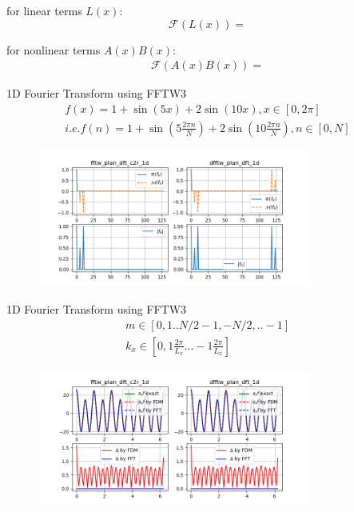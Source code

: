 \documentclass{beamer}
\begin{document}
\begin{frame}
	for linear terms $L(x)$:
	\begin{equation}
		\mathcal{F}(L(x))=
	\end{equation}
	
	for nonlinear terms $A(x)B(x)$:
	\begin{equation}
		\begin{aligned}
			\mathcal{F}(A(x)B(x))=
		\end{aligned}
	\end{equation}
\end{frame}


\begin{frame}{1D Fourier Transform using FFTW3}
	\begin{equation}
		\begin{aligned}
			f(x)=1+\sin(5x)+2\sin(10x), x\in[0,2\pi] \\
			i.e. f(n)=1+\sin(5\frac{2\pi{n}}{N})+2\sin(10\frac{2\pi{n}}{N}), n\in[0,N]
		\end{aligned}
	\end{equation}
	
	\begin{figure}[H]
		\centering
		\includegraphics[width=0.8\textwidth]{./images/1d_k.png}
		\caption{}
	\end{figure}

\end{frame}

\begin{frame}{1D Fourier Transform using FFTW3}
	\begin{equation}
		\begin{aligned}
			m\in[0,1..N/2-1,-N/2,..-1] \\
			k_x\in[0,1\frac{2\pi}{L_x}...-1\frac{2\pi}{L_x}]
		\end{aligned}
	\end{equation}

	\begin{figure}[H]
		\centering
		\includegraphics[width=0.8\textwidth]{./images/1d_d.png}
		\caption{}
	\end{figure}

\end{frame}
\end{document}
